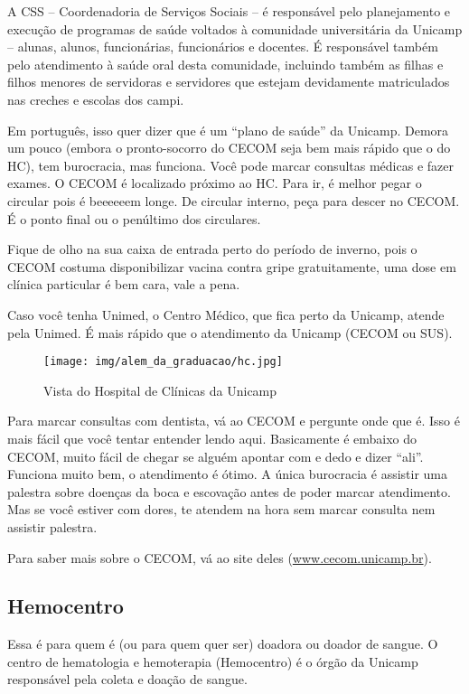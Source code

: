 A CSS -- Coordenadoria de Serviços Sociais -- é responsável pelo planejamento e
execução de programas de saúde voltados à comunidade universitária da Unicamp
-- alunas, alunos, funcionárias, funcionários e docentes. É responsável também
pelo atendimento à saúde oral desta comunidade, incluindo também as filhas e
filhos menores de servidoras e servidores que estejam devidamente matriculados
nas creches e escolas dos campi.

Em português, isso quer dizer que é um ``plano de saúde'' da Unicamp. Demora um
pouco (embora o pronto-socorro do CECOM seja bem mais rápido que o do HC), tem
burocracia, mas funciona. Você pode marcar consultas médicas e fazer exames. O
CECOM é localizado próximo ao HC. Para ir, é melhor pegar o circular pois é
beeeeeem longe. De circular interno, peça para descer no CECOM. É o ponto final
ou o penúltimo dos circulares.

Fique de olho na sua caixa de entrada perto do período de inverno, pois o CECOM
costuma disponibilizar vacina contra gripe gratuitamente, uma dose em clínica
particular é bem cara, vale a pena.

Caso você tenha Unimed, o Centro Médico, que fica perto da Unicamp, atende pela
Unimed. É mais rápido que o atendimento da Unicamp (CECOM ou SUS).

\begin{figure}[h!]
  \centering
  \texttt{[image: img/alem\_da\_graduacao/hc.jpg]}
  \caption*{Vista do Hospital de Clínicas da Unicamp}
\end{figure}

Para marcar consultas com dentista, vá ao CECOM e pergunte onde que é. Isso é
mais fácil que você tentar entender lendo aqui. Basicamente é embaixo do CECOM,
muito fácil de chegar se alguém apontar com e dedo e dizer ``ali''. Funciona
muito bem, o atendimento é ótimo. A única burocracia é assistir uma palestra
sobre doenças da boca e escovação antes de poder marcar atendimento. Mas se
você estiver com dores, te atendem na hora sem marcar consulta nem assistir
palestra.

Para saber mais sobre o CECOM, vá ao site deles (\url{www.cecom.unicamp.br}).

\subsection{Hemocentro}

Essa é para quem é (ou para quem quer ser) doadora ou doador de sangue. O
centro de hematologia e hemoterapia (Hemocentro) é o órgão da Unicamp
responsável pela coleta e doação de sangue.

